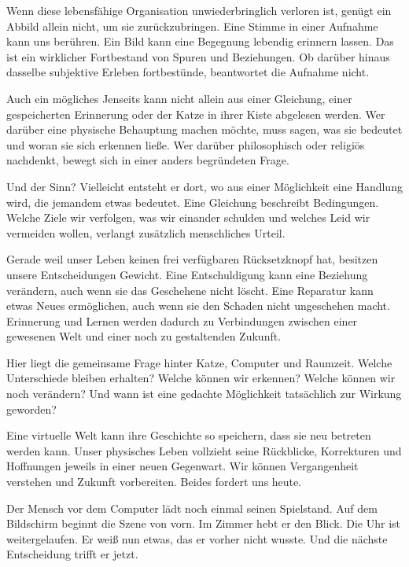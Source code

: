 Wenn diese lebensfähige Organisation unwiederbringlich verloren ist, genügt ein Abbild allein nicht, um sie zurückzubringen. Eine Stimme in einer Aufnahme kann uns berühren. Ein Bild kann eine Begegnung lebendig erinnern lassen. Das ist ein wirklicher Fortbestand von Spuren und Beziehungen. Ob darüber hinaus dasselbe subjektive Erleben fortbestünde, beantwortet die Aufnahme nicht.

Auch ein mögliches Jenseits kann nicht allein aus einer Gleichung, einer gespeicherten Erinnerung oder der Katze in ihrer Kiste abgelesen werden. Wer darüber eine physische Behauptung machen möchte, muss sagen, was sie bedeutet und woran sie sich erkennen ließe. Wer darüber philosophisch oder religiös nachdenkt, bewegt sich in einer anders begründeten Frage.

Und der Sinn? Vielleicht entsteht er dort, wo aus einer Möglichkeit eine Handlung wird, die jemandem etwas bedeutet. Eine Gleichung beschreibt Bedingungen. Welche Ziele wir verfolgen, was wir einander schulden und welches Leid wir vermeiden wollen, verlangt zusätzlich menschliches Urteil.

Gerade weil unser Leben keinen frei verfügbaren Rücksetzknopf hat, besitzen unsere Entscheidungen Gewicht. Eine Entschuldigung kann eine Beziehung verändern, auch wenn sie das Geschehene nicht löscht. Eine Reparatur kann etwas Neues ermöglichen, auch wenn sie den Schaden nicht ungeschehen macht. Erinnerung und Lernen werden dadurch zu Verbindungen zwischen einer gewesenen Welt und einer noch zu gestaltenden Zukunft.

Hier liegt die gemeinsame Frage hinter Katze, Computer und Raumzeit. Welche Unterschiede bleiben erhalten? Welche können wir erkennen? Welche können wir noch verändern? Und wann ist eine gedachte Möglichkeit tatsächlich zur Wirkung geworden?

Eine virtuelle Welt kann ihre Geschichte so speichern, dass sie neu betreten werden kann. Unser physisches Leben vollzieht seine Rückblicke, Korrekturen und Hoffnungen jeweils in einer neuen Gegenwart. Wir können Vergangenheit verstehen und Zukunft vorbereiten. Beides fordert uns heute.

Der Mensch vor dem Computer lädt noch einmal seinen Spielstand. Auf dem Bildschirm beginnt die Szene von vorn. Im Zimmer hebt er den Blick. Die Uhr ist weitergelaufen. Er weiß nun etwas, das er vorher nicht wusste. Und die nächste Entscheidung trifft er jetzt.

